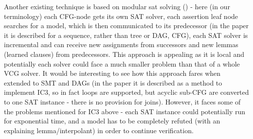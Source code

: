 Another existing technique is based on modular sat solving (\cite{BaylessValBallHoosHu2013}) - here (in our terminology) each CFG-node gets its own SAT solver, each assertion leaf node searches for a model, which is then communicated to its predecessor (in the paper it is described for a sequence, rather than tree or DAG, CFG), each SAT solver is incremental and can receive new assignments from successors and new lemmas (learned clauses) from predecessors.
This approach is appealing as it is local and potentially each solver could face a much smaller problem than that of a whole VCG solver.
It would be interesting to see how this approach fares when extended to SMT and DAGs (in the paper it is described as a method to implement IC3, so in fact loops are supported, but acyclic sub-CFG are converted to one SAT instance - there is no provision for joins).
However, it faces some of the problems mentioned for IC3 above - each SAT instance could potentially run for exponential time, and a model has to be completely refuted (with an explaining lemma/interpolant) in order to continue verification.
